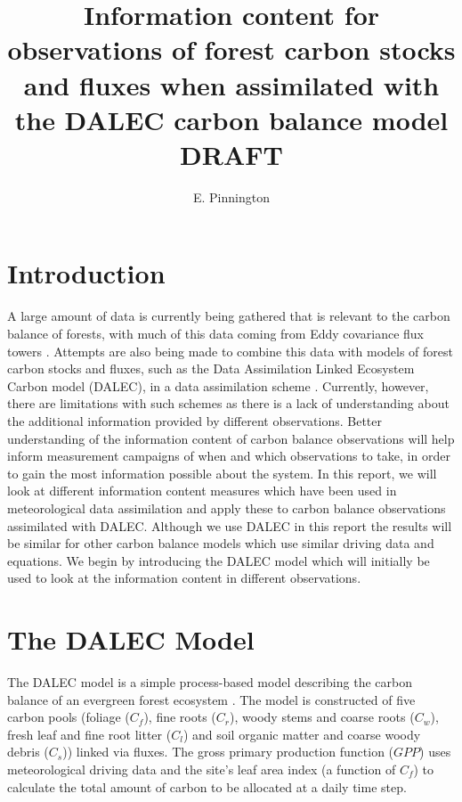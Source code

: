 \documentclass[11pt]{article}
\title{Information content for observations of forest carbon stocks and fluxes when assimilated with the DALEC carbon balance model DRAFT}
\author{\normalsize{E. Pinnington}}
\begin{document}
\maketitle

\section{Introduction}%

A large amount of data is currently being gathered that is relevant to the carbon balance of forests, with much of this data coming from Eddy covariance flux towers \cite{baldocchi2008turner, baldocchi2001fluxnet, running1999global, valentini2000respiration}. Attempts are also being made to combine this data with models of forest carbon stocks and fluxes, such as the Data Assimilation Linked Ecosystem Carbon model (DALEC), in a data assimilation scheme \cite{williams2005improved, fox2009reflex}. Currently, however, there are limitations with such schemes as there is a lack of understanding about the additional information provided by different observations. Better understanding of the information content of carbon balance observations will help inform measurement campaigns of when and which observations to take, in order to gain the most information possible about the system. In this report, we will look at different information content measures which have been used in meteorological data assimilation \cite{rodgers2000inverse, fisher2003estimation, sandu2012practical} and apply these to carbon balance observations assimilated with DALEC. Although we use DALEC in this report the results will be similar for other carbon balance models which use similar driving data and equations. We begin by introducing the DALEC model which will initially be used to look at the information content in different observations.

\section{The DALEC Model}%

The DALEC model is a simple process-based model describing the carbon balance of an evergreen forest ecosystem \cite{williams2005improved}. The model is constructed of five carbon pools (foliage ($C_f$), fine roots ($C_r$), woody stems and coarse roots ($C_w$), fresh leaf and fine root litter ($C_l$) and soil organic matter and coarse woody debris ($C_s$)) linked via fluxes. The gross primary production function ($GPP$) uses meteorological driving data and the site's leaf area index (a function of $C_f$) to calculate the total amount of carbon to be allocated at a daily time step.   
\end{document}
